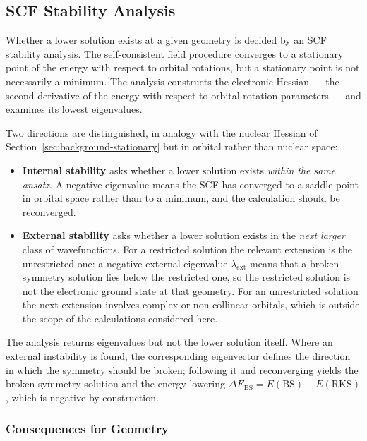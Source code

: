 \subsection{SCF Stability Analysis}
\label{sec:background-stability}

Whether a lower solution exists at a given geometry is decided by an SCF
stability analysis. The self-consistent field procedure converges to a stationary
point of the energy with respect to orbital rotations, but a stationary point is
not necessarily a minimum. The analysis constructs the electronic Hessian --- the
second derivative of the energy with respect to orbital rotation parameters ---
and examines its lowest eigenvalues.

Two directions are distinguished, in analogy with the nuclear Hessian of
Section~\ref{sec:background-stationary} but in orbital rather than nuclear space:

\begin{itemize}
  \item \textbf{Internal stability} asks whether a lower solution exists
    \emph{within the same ansatz}. A negative eigenvalue means the SCF has
    converged to a saddle point in orbital space rather than to a minimum, and
    the calculation should be reconverged.
  \item \textbf{External stability} asks whether a lower solution exists in the
    \emph{next larger} class of wavefunctions. For a restricted solution the
    relevant extension is the unrestricted one: a negative external eigenvalue
    $\lambda_\mathrm{ext}$ means that a broken-symmetry solution lies below the
    restricted one, so the restricted solution is not the electronic ground
    state at that geometry. For an unrestricted solution the next extension
    involves complex or non-collinear orbitals, which is outside the scope of
    the calculations considered here.
\end{itemize}

The analysis returns eigenvalues but not the lower solution itself. Where an
external instability is found, the corresponding eigenvector defines the
direction in which the symmetry should be broken; following it and reconverging
yields the broken-symmetry solution and the energy lowering $\Delta
E_\mathrm{BS} = E(\mathrm{BS}) - E(\mathrm{RKS})$, which is negative by
construction.

\subsubsection{Consequences for Geometry}

